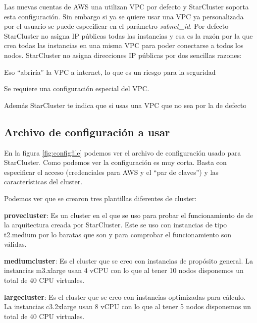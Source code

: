 \documentclass{article}
\begin{document}
	Las nuevas cuentas de AWS una utilizan VPC por defecto y  StarCluster soporta esta configuración. Sin embargo si ya se quiere usar una VPC ya personalizada por el usuario se puede especificar en el parámetro \emph{subnet\_id}. Por defecto StarCluster no asigna IP públicas todas las instancias y esa es la razón por la que crea todas las instancias en una misma VPC para poder conectarse a todos los nodos. StarCluster no asigna direcciones IP públicas por dos sencillas razones:
{\setlength{\parskip}{0mm}
\begin{enumerate}
{\setlength{\parskip}{0mm}
	\item Eso ``abriría'' la VPC a internet, lo que es un riesgo para la seguridad
	\item Se requiere una configuración especial del VPC.
}
\end{enumerate} 
}
	Además StarCluster te indica que si usas una VPC que no sea por la de defecto

\subsection{Archivo de configuración a usar}
	En la figura \ref{fig:configfile} podemos ver el archivo de configuración usado para StarCluster. Como podemos ver la configuración es muy corta. Basta con especificar el acceso (credenciales para AWS y el ``par de claves'') y las características del cluster.
	
	Podemos ver que se crearon tres plantillas diferentes de cluster:
{\setlength{\parskip}{0mm}
\begin{enumerate}
{\setlength{\parskip}{0mm}
	\item \textbf{provecluster}: Es un cluster en el que se uso para probar el funcionamiento de de la arquitectura creada por StarCluster. Este se uso con instancias de tipo t2.medium por lo baratas que son y para comprobar el funcionamiento son válidas.
	\item \textbf{mediumcluster}: Es el cluster que se creo con instancias de propósito general. La instancias m3.xlarge usan 4 vCPU con lo que al tener 10 nodos disponemos un total de 40 CPU virtuales.
	\item \textbf{largecluster}: Es el cluster que se creo con instancias optimizadas para cálculo. La instancias c3.2xlarge usan 8 vCPU con lo que al tener 5 nodos disponemos un total de 40 CPU virtuales.
}
\end{enumerate}
}
\end{document}
